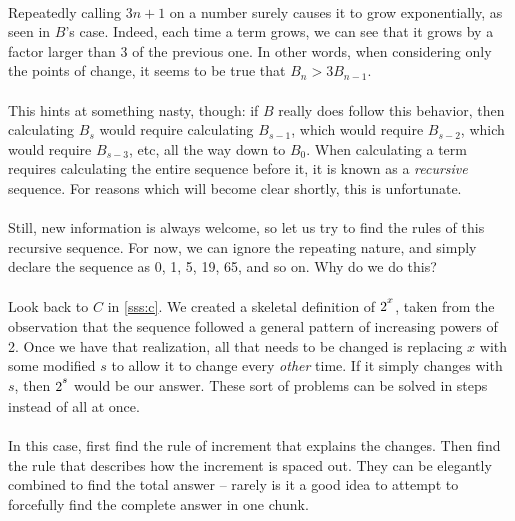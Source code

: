 \documentclass[12pt,letterpaper]{article}
\begin{document}
			\paragraph{} Repeatedly calling $3n + 1$ on a number surely causes it to grow exponentially, as seen in $B$'s case. Indeed, each time a term grows, we can see that it grows by a factor larger than 3 of the previous one. In other words, when considering only the points of change, it seems to be true that $B_n > 3B_{n-1}$.
			
			\paragraph{} This hints at something nasty, though: if $B$ really does follow this behavior, then calculating $B_s$ would require calculating $B_{s-1}$, which would require $B_{s-2}$, which would require $B_{s-3}$, etc, all the way down to $B_0$. When calculating a term requires calculating the entire sequence before it, it is known as a \textit{recursive} sequence. For reasons which will become clear shortly, this is unfortunate.
			
			\paragraph{} Still, new information is always welcome, so let us try to find the rules of this recursive sequence. For now, we can ignore the repeating nature, and simply declare the sequence as 0, 1, 5, 19, 65, and so on. Why do we do this? 
			
			\paragraph{} Look back to $C$ in \ref{sss:c}. We created a skeletal definition of $2\strut^x$, taken from the observation that the sequence followed a general pattern of increasing powers of 2. Once we have that realization, all that needs to be changed is replacing $x$ with some modified $s$ to allow it to change every \textit{other} time. If it simply changes with $s$, then $2\strut^s$ would be our answer. These sort of problems can be solved in steps instead of all at once. 
			
			\paragraph{} In this case, first find the rule of increment that explains the changes. Then find the rule that describes how the increment is spaced out. They can be elegantly combined to find the total answer -- rarely is it a good idea to attempt to forcefully find the complete answer in one chunk.
			
\end{document}

